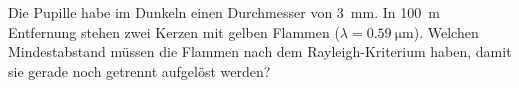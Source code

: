 \begin{ExerciseBlock}
Die Pupille habe im Dunkeln einen Durchmesser von \qty{3}{\milli\metre}. In \qty{100}{\metre} Entfernung stehen zwei Kerzen mit gelben Flammen ($\lambda=\qty{0.59}{\micro\metre}$). Welchen Mindestabstand müssen die Flammen nach dem Rayleigh-Kriterium haben, damit sie gerade noch getrennt aufgelöst werden?
\end{ExerciseBlock}

